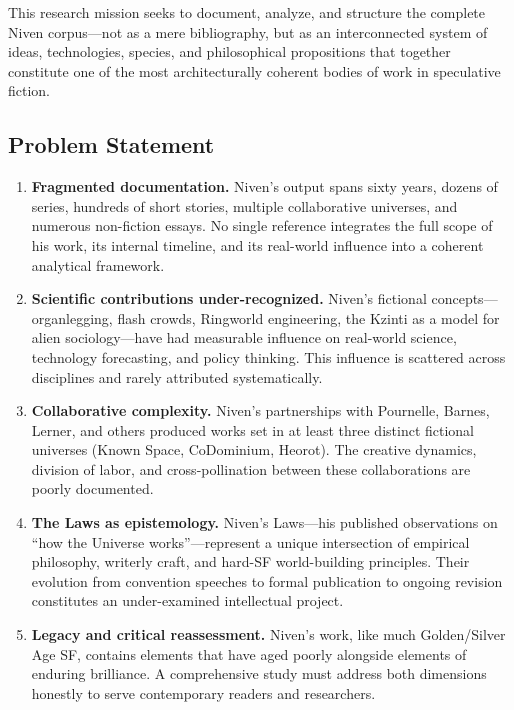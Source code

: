 \documentclass[11pt,letterpaper]{article}
\begin{document}
This research mission seeks to document, analyze, and structure the complete Niven corpus---not as a mere bibliography, but as an interconnected system of ideas, technologies, species, and philosophical propositions that together constitute one of the most architecturally coherent bodies of work in speculative fiction.

\subsection{Problem Statement}

\begin{enumerate}[leftmargin=2em]
\item \textbf{Fragmented documentation.} Niven's output spans sixty years, dozens of series, hundreds of short stories, multiple collaborative universes, and numerous non-fiction essays. No single reference integrates the full scope of his work, its internal timeline, and its real-world influence into a coherent analytical framework.

\item \textbf{Scientific contributions under-recognized.} Niven's fictional concepts---organlegging, flash crowds, Ringworld engineering, the Kzinti as a model for alien sociology---have had measurable influence on real-world science, technology forecasting, and policy thinking. This influence is scattered across disciplines and rarely attributed systematically.

\item \textbf{Collaborative complexity.} Niven's partnerships with Pournelle, Barnes, Lerner, and others produced works set in at least three distinct fictional universes (Known Space, CoDominium, Heorot). The creative dynamics, division of labor, and cross-pollination between these collaborations are poorly documented.

\item \textbf{The Laws as epistemology.} Niven's Laws---his published observations on ``how the Universe works''---represent a unique intersection of empirical philosophy, writerly craft, and hard-SF world-building principles. Their evolution from convention speeches to formal publication to ongoing revision constitutes an under-examined intellectual project.

\item \textbf{Legacy and critical reassessment.} Niven's work, like much Golden/Silver Age SF, contains elements that have aged poorly alongside elements of enduring brilliance. A comprehensive study must address both dimensions honestly to serve contemporary readers and researchers.
\end{enumerate}
\end{document}
